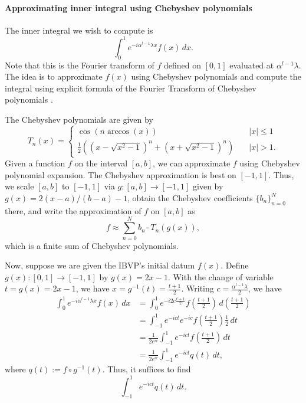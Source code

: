 \documentclass[12pt, oneside, a4paper]{article}
\begin{document}
\paragraph{Approximating inner integral using Chebyshev polynomials}\mbox{}\label{par:approximate_integral_chebyshev}

The inner integral we wish to compute is
\[\int_0^1 e^{-i\alpha^{l-1}\lambda x}f(x)\,dx.\]
Note that this is the Fourier transform of $f$ defined on $[0,1]$ evaluated at $\alpha^{l-1}\lambda$.
The idea is to approximate $f(x)$ using Chebyshev polynomials and compute the integral using explicit formula of the Fourier Transform of Chebyshev polynomials \cite{Fokas2012}.

The Chebyshev polynomials are given by
\[
    T_n(x) =
\begin{cases}
    \cos(n \arccos(x))&\quad\mbox{$|x|\leq 1$}\\
    \frac{1}{2}\left((x-\sqrt{x^2-1})^n + (x+\sqrt{x^2-1})^n\right)&\quad\mbox{$|x|>1$}.
\end{cases}    
\]
Given a function $f$ on the interval $[a,b]$, we can approximate $f$ using Chebyshev polynomial expansion. The Chebyshev approximation is best on $[-1,1]$. Thus, we scale $[a,b]$ to $[-1,1]$ via $g:[a,b]\to [-1,1]$ given by $g(x)=2(x-a)/(b-a)-1$, obtain the Chebyshev coefficients $\{b_n\}_{n=0}^N$ there, and write the approximation of $f$ on $[a,b]$ as
\[f\approx \sum_{n=0}^N b_n\cdot T_n(g(x)),\]
which is a finite sum of Chebyshev polynomials.

Now, suppose we are given the IBVP's initial datum $f(x)$. Define $g(x):[0,1]\to [-1,1]$ by $g(x)=2x-1$. With the change of variable $t=g(x)=2x-1$, we have $x=g^{-1}(t)=\frac{t+1}{2}$. Writing $c=\frac{\alpha^{l-1}\lambda}{2}$, we have
\begin{align*}
    \int_0^1 e^{-i\alpha^{l-1}\lambda x}f(x)\,dx &= \int_0^1 e^{-i2c\frac{t+1}{2}}f\left(\frac{t+1}{2}\right)\,d\left(\frac{t+1}{2}\right)\\
    &= \int_{-1}^1 e^{-ict}e^{-ic}f\left(\frac{t+1}{2}\right)\frac{1}{2}\,dt\\
    &= \frac{1}{2e^{ic}}\int_{-1}^1 e^{-ict} f\left(\frac{t+1}{2}\right)\,dt\\
    &= \frac{1}{2e^{ic}}\int_{-1}^1 e^{-ict} q(t)\,dt,
\end{align*}
where $q(t) := f\circ g^{-1}(t)$. Thus, it suffices to find 
\[\int_{-1}^1 e^{-ict} q(t)\,dt.\]
\end{document}
